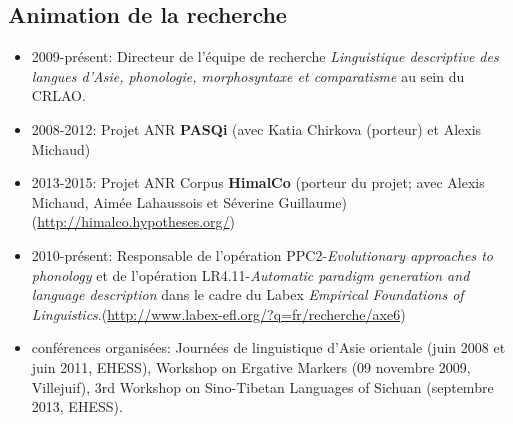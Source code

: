 \documentclass[oldfontcommands,oneside,a4paper,11pt]{article}
\begin{document}
\subsection*{Animation de la recherche}
\begin{itemize}
\item 2009-présent: Directeur de l'équipe de recherche \textit{Linguistique descriptive des langues d’Asie, phonologie, morphosyntaxe et comparatisme} au sein du CRLAO.
\item 2008-2012: Projet ANR \textbf{PASQi} (avec Katia Chirkova (porteur) et Alexis Michaud) 
\item  2013-2015: Projet ANR Corpus \textbf{HimalCo} (porteur du projet; avec Alexis Michaud, Aimée Lahaussois et Séverine Guillaume) (\url{http://himalco.hypotheses.org/})
\item 2010-présent: Responsable de l'opération PPC2-\textit{Evolutionary approaches to phonology} et de l'opération LR4.11-\textit{Automatic paradigm generation and language description} dans le cadre du Labex \textit{Empirical Foundations of Linguistics}.(\url{http://www.labex-efl.org/?q=fr/recherche/axe6})
\item conférences organisées: Journées de linguistique d'Asie orientale (juin 2008 et juin 2011, EHESS),  Workshop on Ergative Markers (09 novembre 2009, Villejuif), 3rd Workshop on Sino-Tibetan Languages of Sichuan (septembre 2013, EHESS).
\end{itemize}
  
\end{document}
